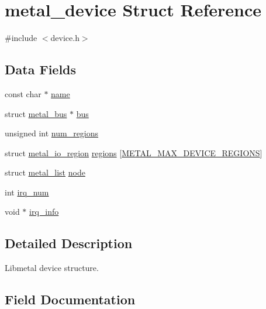 \hypertarget{structmetal__device}{}\section{metal\+\_\+device Struct Reference}
\label{structmetal__device}


{\ttfamily \#include $<$device.\+h$>$}

\subsection*{Data Fields}
\begin{DoxyCompactItemize}
\item 
const char $\ast$ \hyperlink{structmetal__device_a25e7f2938bdfbb0f44ce11331b93950c}{name}
\item 
struct \hyperlink{structmetal__bus}{metal\+\_\+bus} $\ast$ \hyperlink{structmetal__device_a107ec9c3c66c05195484dcbb3ebe4013}{bus}
\item 
unsigned int \hyperlink{structmetal__device_ab224bb579781a75e939373e23e1a7691}{num\+\_\+regions}
\item 
struct \hyperlink{structmetal__io__region}{metal\+\_\+io\+\_\+region} \hyperlink{structmetal__device_ad6a86618d3c23da03de5d2b0961a8ba1}{regions} \mbox{[}\hyperlink{system_2zephyr_2sys_8h_ade1e205242a3d9e8ec25535d263aa664}{M\+E\+T\+A\+L\+\_\+\+M\+A\+X\+\_\+\+D\+E\+V\+I\+C\+E\+\_\+\+R\+E\+G\+I\+O\+NS}\mbox{]}
\item 
struct \hyperlink{structmetal__list}{metal\+\_\+list} \hyperlink{structmetal__device_acafd9802f3390dfefbdb6040be7028db}{node}
\item 
int \hyperlink{structmetal__device_a676e14274f7283f085570ddf922adc69}{irq\+\_\+num}
\item 
void $\ast$ \hyperlink{structmetal__device_a190447b4d7bfc349e78a3360b28695ea}{irq\+\_\+info}
\end{DoxyCompactItemize}


\subsection{Detailed Description}
Libmetal device structure. 

\subsection{Field Documentation}
\mbox{\label{structmetal__device_a107ec9c3c66c05195484dcbb3ebe4013}} 
